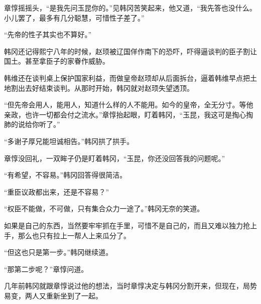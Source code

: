 章惇摇摇头，“是我先问玉昆你的。”见韩冈苦笑起来，他又道，“我先答也没什么。小儿罢了，最多有几分聪慧，可惜性子差了。”

“先帝的性子其实也不算好。”

韩冈还记得熙宁八年的时候，赵顼被辽国佯作南下的恐吓，吓得逼谈判的臣子割让国土。甚至拿臣子的家眷作威胁。

韩维还在谈判桌上保护国家利益，而做皇帝赵顼却从后面拆台，逼着韩维早点把土地割出去好结束谈判。从那时开始，韩冈就对赵顼失望透顶。

“但先帝会用人，能用人，知道什么样的人不能用。如今的皇帝，全无分寸。等他亲政，也许一切都会付之流水。”章惇抬起眼，盯着韩冈，“玉昆，我这可是掏心掏肺的说给你听了。”

“多谢子厚兄能坦诚相告。”韩冈拱了拱手。

章惇没回礼，一双眸子仍是盯着韩冈，“玉昆，你还没回答我的问题呢。”

“有希望，不容易。”韩冈回答得很简洁。

“重臣议政都出来，还是不容易？”

“权臣不能做，不可做，只有集合众力一途了。”韩冈无奈的笑道。

如果是自己的东西，当然要牢牢抓在手里，可惜不是自己的，而且又难以独力抢上手，那么也只有拉上一帮人上来瓜分了。

“但这也只是第一步。”韩冈继续道。

“那第二步呢？”章惇问道。

几年前韩冈就跟章惇说过他的想法，当时章惇决定与韩冈分割开来，但现在，局势易变，两人又重新坐到了一起。
